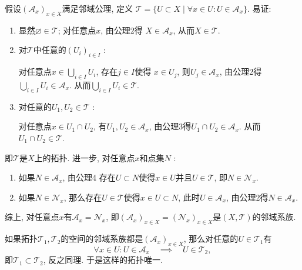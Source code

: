 \documentclass[UTF8]{ctexart}
\begin{document}
假设$(\mathcal{A}_x)_{x\in X}$满足邻域公理, 定义
$\mathcal{T}=\{U\subset X\mid\forall x\in U:U\in\mathcal{A}_x\}$. 易证:
\begin{enumerate}
    \item 显然$\varnothing\in\mathcal{T}$; 对任意点$x$, 由公理2得
    $X\in\mathcal{A}_x$, 从而$X\in\mathcal{T}$.

    \item 对$\mathcal{T}$中任意的$(U_i)_{i\in I}$ :
    
    \vspace{3pt}\hspace{2.17em}
    对任意点$\displaystyle x\in\bigcup_{i\in I}U_i$, 存在$j\in I$使得
    $x\in U_j$, 则$U_j\in\mathcal{A}_x$,
    由公理2得$\displaystyle\bigcup_{i\in I}U_i\in\mathcal{A}_x$.
    从而$\displaystyle\bigcup_{i\in I}U_i\in\mathcal{T}$.

    \vspace{3pt}
    \item 对任意的$U_1,U_2\in\mathcal{T}$ :
    
    \hspace{2.17em}
    对任意点$x\in U_1\cap U_2$, 有$U_1,U_2\in\mathcal{A}_x$,
    由公理3得$U_1\cap U_2\in\mathcal{A}_x$. 从而$U_1\cap U_2\in\mathcal{T}$.
\end{enumerate}
即$\mathcal{T}$是$X$上的拓扑. 进一步, 对任意点$x$和点集$N$ :
\begin{enumerate}
    \item 如果$N\in\mathcal{A}_x$, 由公理4
    存在$U\subset N$使得$x\in U$并且$U\in\mathcal{T}$, 即$N\in\mathcal{N}_x$.
    \item 如果$N\in\mathcal{N}_x$, 那么存在$U\in\mathcal{T}$使得$x\in U\subset N$,
    此时$U\in\mathcal{A}_x$, 由公理2得$N\in\mathcal{A}_x$.
\end{enumerate}
综上, 对任意点$x$有$\mathcal{A}_x=\mathcal{N}_x$,
即$(\mathcal{A}_x)_{x\in X}=(\mathcal{N}_x)_{x\in X}$是$(X,\mathcal{T})$的邻域系族.

如果拓扑$\mathcal{T}_1,\mathcal{T}_2$的空间的邻域系族都是$(\mathcal{A}_x)_{x\in X}$,
那么对任意的$U\in\mathcal{T}_1$有
\[
    \forall x\in U:U\in\mathcal{A}_x\quad\implies\quad U\in\mathcal{T}_2,
\]
即$\mathcal{T}_1\subset\mathcal{T}_2$, 反之同理. 于是这样的拓扑唯一.

\end{document}
